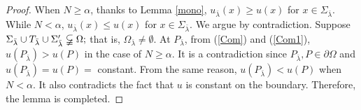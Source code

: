 \documentclass[12pt]{amsproc}
\theoremstyle{plain}
\numberwithin{equation}{section}
\begin{document}
\begin{proof}

When $N\geq \alpha$, thanks to Lemma \ref{mono},
$u_{\bar\lambda}(x)\geq u(x)$ for $x\in \Sigma_{\bar\lambda}.$ While
$ N<\alpha$, $u_{\bar\lambda}(x)\leq u(x)$ for $x\in
\Sigma_{\bar\lambda}.$ We argue by contradiction. Suppose $
\Sigma_{\bar\lambda}\cup
T_{\bar\lambda}\cup\Sigma^\prime_{\bar\lambda}\varsubsetneqq\Omega;$
that is, $\Omega_{\bar\lambda}\not=\emptyset.$ At $
P_{\bar\lambda}$, from (\ref{Com}) and (\ref{Com1}),
$u(P_{\bar\lambda})>u(P)$ in the case of $ N\geq \alpha$. It is a
contradiction since $P_{\bar\lambda}, P\in
\partial\Omega$ and $u(P_{\bar\lambda})=u(P)=$ constant. From the
same reason, $u(P_{\bar\lambda})<u(P)$ when $N<\alpha$. It also
contradicts the fact that $u$ is constant on the boundary.
Therefore, the lemma is completed.

\end{proof}
\end{document}
